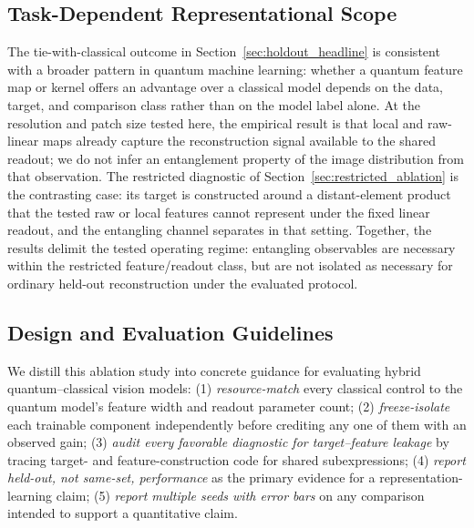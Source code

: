 \documentclass[11pt]{article}
\begin{document}
\subsection{Task-Dependent Representational Scope}
The tie-with-classical outcome in Section~\ref{sec:holdout_headline} is consistent with a broader pattern in quantum machine learning: whether a quantum feature map or kernel offers an advantage over a classical model depends on the data, target, and comparison class rather than on the model label alone. At the resolution and patch size tested here, the empirical result is that local and raw-linear maps already capture the reconstruction signal available to the shared readout; we do not infer an entanglement property of the image distribution from that observation. The restricted diagnostic of Section~\ref{sec:restricted_ablation} is the contrasting case: its target is constructed around a distant-element product that the tested raw or local features cannot represent under the fixed linear readout, and the entangling channel separates in that setting. Together, the results delimit the tested operating regime: entangling observables are necessary within the restricted feature/readout class, but are not isolated as necessary for ordinary held-out reconstruction under the evaluated protocol.

\subsection{Design and Evaluation Guidelines}
We distill this ablation study into concrete guidance for evaluating hybrid quantum--classical vision models: (1) \emph{resource-match} every classical control to the quantum model's feature width and readout parameter count; (2) \emph{freeze-isolate} each trainable component independently before crediting any one of them with an observed gain; (3) \emph{audit every favorable diagnostic for target--feature leakage} by tracing target- and feature-construction code for shared subexpressions; (4) \emph{report held-out, not same-set, performance} as the primary evidence for a representation-learning claim; (5) \emph{report multiple seeds with error bars} on any comparison intended to support a quantitative claim.
\end{document}
